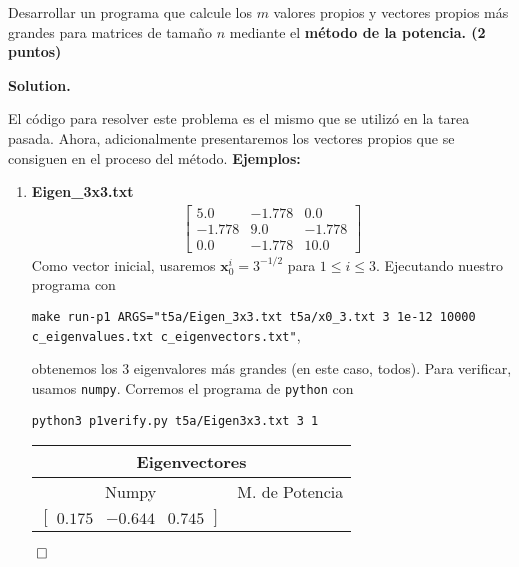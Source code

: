 \documentclass{article}
\theoremstyle{problemstyle}
\newenvironment{solution}{%
  \begin{mdframed}[linewidth=0.8pt,linecolor=Gray,backgroundcolor=Gray!5,roundcorner=5pt]%
  \noindent\textbf{Solution.}%
}{%
\hfill $ \qed $ 
  \end{mdframed}%
}
\begin{document}
\begin{problem}
Desarrollar un programa que calcule los $ m $ valores propios y vectores
propios más grandes para matrices de tama\~no $ n $ mediante el
\textbf{m\'etodo de la potencia. (2 puntos)}
\end{problem}

\begin{solution}
	El c\'odigo para resolver este problema es el mismo que se utiliz\'o en la
	tarea pasada. Ahora, adicionalmente presentaremos los vectores propios que se
	consiguen en el proceso del m\'etodo.
	\textbf{Ejemplos:}
	\begin{enumerate}
		\item \textbf{Eigen\_3x3.txt}
		      \begin{align*}
			      \begin{bmatrix}
				      5.0    & -1.778 & 0.0    \\
				      -1.778 & 9.0    & -1.778 \\
				      0.0    & -1.778 & 10.0
			      \end{bmatrix}
		      \end{align*}
		      Como vector inicial, usaremos $ \mathbf{x}_0^i = 3^{-1/2} $ para $
			      1\leq i \leq 3 $.
		      Ejecutando nuestro programa con
		      \begin{center}
			      \texttt{make run-p1
				      ARGS="t5a/Eigen\_3x3.txt t5a/x0\_3.txt 3 1e-12 10000 c\_eigenvalues.txt c\_eigenvectors.txt"},
		      \end{center}
		      obtenemos los 3 eigenvalores m\'as grandes (en este caso, todos).
		      Para verificar, usamos \texttt{numpy}. Corremos el programa de
		      \texttt{python} con
		      \begin{center}
			      \texttt{python3 p1\textunderscore verify.py t5a/Eigen\textunderscore3x3.txt 3 1}
		      \end{center}
		      \begin{table}[H]
			      \begin{center}
				      \begin{tabular}{|c|c|}
					      \multicolumn{2}{c}{Eigenvectores}               \\
					      \hline
					      Numpy                   & M. de Potencia        \\
					      \hline
					      \rule{0pt}{1.5em}
					      $ \begin{bmatrix}
							        0.175 & -0.644 & 0.745
						        \end{bmatrix} $ &

\end{tabular}
\end{center}
\end{table}
\end{enumerate}
\end{solution}
\end{document}
